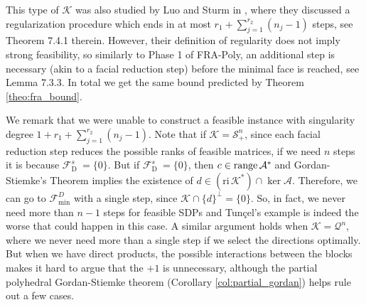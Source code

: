 \documentclass{article}
\newcommand{\SOC}[1]{{\mathcal{Q}^{#1}}}
\newcommand{\reInt}{\mathrm{ri}\,}
\newcommand{\feasS}{\mathcal{F}_{\text{D }}^s}
\newcommand{\PSDcone}[1]{{\mathcal{S}^{#1}_+}}
\newcommand{\minFaceD}{ {\mathcal{F}_{\min}^D}}
\newcommand{\stdMap}{ {\mathcal{A}}}
\newcommand{\stdCone}{ {\mathcal{K}}}
\newcommand{\matRange}{{\mathrm{ range } \,}}
\newcommand{\T}{\ast\hspace{-1pt}}
\begin{document}
This type of $\stdCone$ was also studied by Luo and Sturm in \cite{sturm_handbook}, 
where they discussed a regularization procedure which ends in at most $r_1 + \sum _{j = 1}^{r_2} (n_j  - 1)$ steps, see Theorem 7.4.1 therein. However, their definition of regularity does not imply strong feasibility, so similarly to Phase 1 of FRA-Poly, an additional step is necessary  (akin to a facial reduction step)  before the minimal face is reached, see Lemma 7.3.3. In total we get the same 
bound predicted by Theorem \ref{theo:fra_bound}.



We remark that we were unable to  construct a feasible instance with singularity degree $1+r_1 + \sum _{j = 1}^{r_2} (n_j  - 1)$. Note that if $\stdCone = \PSDcone{n}$, 
since each facial reduction step reduces the possible ranks of feasible matrices, if we need 
$n$ steps it is because $\feasS = \{0\}$. But if $\feasS = \{0\}$, then $c \in \matRange \stdMap^\T$ and Gordan-Stiemke's Theorem implies
the existence of $d \in (\reInt \stdCone^*) \cap \ker \stdMap$. Therefore, we can go to $\minFaceD$ with a single step, since 
$\stdCone \cap \{d\}^\perp = \{0\}$. So, in fact, 
we never need more than $n-1$ steps for feasible SDPs and Tun\c{c}el's example is indeed the worse that could happen in this case. 
A similar argument holds when 
$\stdCone = \SOC{n}$, where we never need more than a single step if we select the directions optimally.
But when we have direct products,  the possible interactions between the blocks makes it hard to argue 
that the $+1$ is unnecessary, although the partial polyhedral Gordan-Stiemke theorem (Corollary \ref{col:partial_gordan})  helps rule out a few 
cases.
\end{document}
